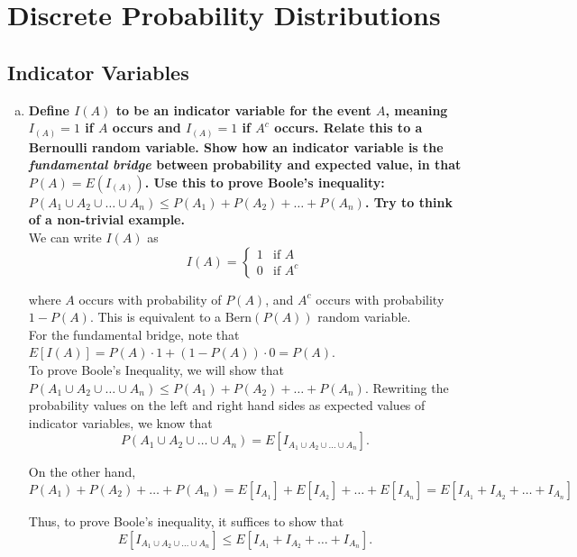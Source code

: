 \section{Discrete Probability Distributions}

\setcounter{subsection}{1}
\subsection{Indicator Variables}

\begin{enumerate}[a)]

    \item \textbf{Define $I(A)$ to be an indicator variable for the event $A$, meaning $I_{(A)} = 1$ if $A$ occurs and $I_{(A)} = 1$ if $A^c$ occurs. Relate this to a Bernoulli random variable. Show how an indicator variable is the \textit{fundamental bridge} between probability and expected value, in that $P(A) = E(I_{(A)})$. Use this to prove Boole's inequality: $P(A_1 \cup A_2 \cup \dots \cup A_n) \leq P(A_1) + P(A_2) + \dots + P(A_n)$. Try to think of a non-trivial example.} \\
    
    We can write $I(A)$ as 
    \[
        I(A) = \begin{cases} 
        1 & \text{if }A \\
        0 & \text{if }A^c
        \end{cases}
    \]
    
    where $A$ occurs with probability of $P(A)$, and $A^c$ occurs with probability $1- P(A)$. This is equivalent to a $\text{Bern}(P(A))$ random variable. \\
    
    For the fundamental bridge, note that $E[I(A)] = P(A) \cdot 1 + (1 - P(A)) \cdot 0 = P(A)$. \\
    
    To prove Boole's Inequality, we will show that $P(A_1 \cup A_2 \cup \dots \cup A_n) \leq P(A_1) + P(A_2) + \dots + P(A_n)$. 
    Rewriting the probability values on the left and right hand sides as expected values of indicator variables, we know that 
    \[ 
        P(A_1 \cup A_2 \cup \dots \cup A_n) = E[I_{A_1 \cup A_2 \cup \dots \cup A_n}].
    \]

    On the other hand, 
    \[
        P(A_1) + P(A_2) + \dots + P(A_n) = E[I_{A_1}] + E[I_{A_2}] + \dots + E[I_{A_n}] = E[I_{A_1} + I_{A_2} + \dots + I_{A_n}]
    \]

    Thus, to prove Boole's inequality, it suffices to show that
    \[
            E[I_{A_1 \cup A_2 \cup \dots \cup A_n}] \leq E[I_{A_1} + I_{A_2} + \dots + I_{A_n}].
    \]
    

\end{enumerate}
